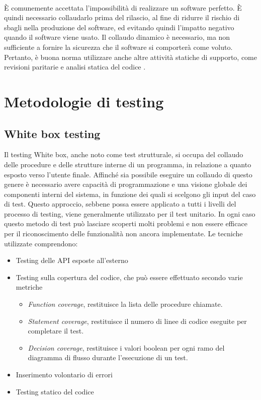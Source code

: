 \documentclass[../main.tex]{subfiles}
\begin{document}
\paragraph{}
È comunemente accettata l'impossibilità di realizzare un software perfetto. È quindi necessario collaudarlo prima del rilascio, al fine di ridurre il rischio di sbagli nella produzione del software, ed evitando quindi l'impatto negativo quando il software viene usato.
Il collaudo dinamico è necessario, ma non sufficiente a fornire la sicurezza che il software si comporterà come voluto. Pertanto, è buona norma utilizzare anche altre attività statiche di supporto, come revisioni paritarie e analisi statica del codice \cite{iso29119}.
\section{Metodologie di testing}
\subsection{White box testing}
Il testing White box, anche noto come test strutturale, si occupa del collaudo delle procedure e delle strutture interne di un programma, in relazione a quanto esposto verso l'utente finale.
Affinché sia possibile eseguire un collaudo di questo genere è necessario avere capacità di programmazione e una visione globale dei componenti interni del sistema, in funzione dei quali si scelgono gli input del caso di test.
Questo approccio, sebbene possa essere applicato a tutti i livelli del processo di testing, viene generalmente utilizzato per il test unitario.
In ogni caso questo metodo di test può lasciare scoperti molti problemi e non essere efficace per il riconoscimento delle funzionalità non ancora implementate.
Le tecniche utilizzate comprendono:
\begin{itemize}
\item Testing delle API esposte all'esterno
\item Testing sulla copertura del codice, che può essere effettuato secondo varie metriche
\begin{itemize}
\item \textit{Function coverage}, restituisce la lista delle procedure chiamate.
\item \textit{Statement coverage}, restituisce il numero di linee di codice eseguite per completare il test.
\item \textit{Decision coverage}, restituisce i valori boolean per ogni ramo del diagramma di flusso durante l'esecuzione di un test.
\end{itemize}
\item Inserimento volontario di errori
\item Testing statico del codice
\end{itemize}
\end{document}
